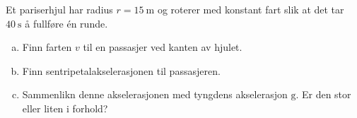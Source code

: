 %
Et pariserhjul har radius $r = \SI{15}{\metre}$ og roterer med konstant fart slik at det tar $\SI{40}{\second}$ å fullføre én runde.
\begin{enumerate}[a)]
    \item Finn farten $v$ til en passasjer ved kanten av hjulet.
    \item Finn sentripetalakselerasjonen til passasjeren.
    \item Sammenlikn denne akselerasjonen med tyngdens akselerasjon $\mathrm{g}$. Er den stor eller liten i forhold?
\end{enumerate}
